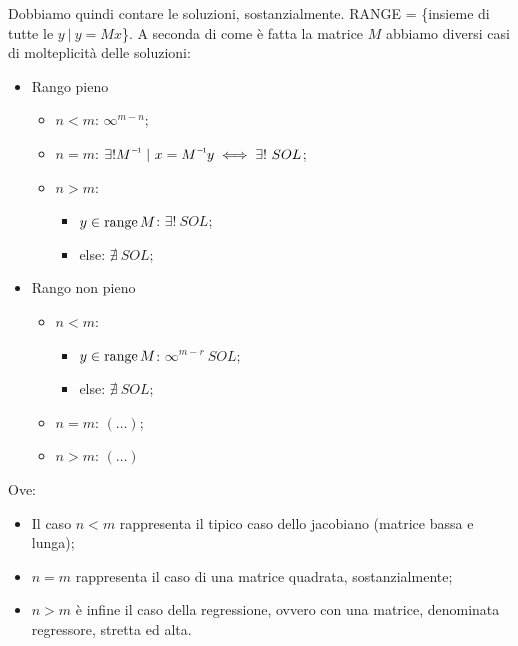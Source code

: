 Dobbiamo quindi contare le soluzioni, sostanzialmente. RANGE = \{insieme di tutte le $y\ |\ y=Mx$\}. A seconda di come è fatta la matrice $M$ abbiamo diversi casi di molteplicità delle soluzioni:

\begin{itemize}

\item{Rango pieno}

\begin{itemize}

\item{$n<m$}: $\infty^{m-n}$;
\item{$n=m$}: $\exists! \inv{M}\ |\ x=\inv{M}y \iff \exists!\ SOL$;
\item{$n>m$}:

\begin{itemize}
\item{$y\in\operatorname{range}{M}$}: $\exists!\ SOL$;
\item{else}: $\nexists\ SOL$;
\end{itemize}

\end{itemize}

\item{Rango non pieno}

\begin{itemize}

\item{$n<m$}:

\begin{itemize}
\item{$y\in\operatorname{range}{M}$}: $\infty^{m-r}\ SOL$;
\item{else}: $\nexists\ SOL$;
\end{itemize}

\item{$n=m$}: $(\dots)$;
\item{$n>m$}: $(\dots)$

\end{itemize}

\end{itemize}

Ove:

\begin{itemize}

\item Il caso $n<m$ rappresenta il tipico caso dello jacobiano (matrice bassa e lunga);
\item $n=m$ rappresenta il caso di una matrice quadrata, sostanzialmente;
\item $n>m$ è infine il caso della regressione, ovvero con una matrice, denominata regressore, stretta ed alta.

\end{itemize}

